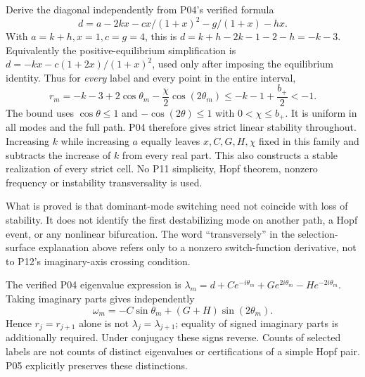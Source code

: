 \documentclass[11pt]{article}
\begin{document}
Derive the diagonal independently from P04's verified formula
\[
 d=a-2kx-cx/(1+x)^2-g/(1+x)-hx.
\]
With $a=k+h,x=1,c=g=4$, this is
$d=k+h-2k-1-2-h=-k-3$. Equivalently the positive-equilibrium
simplification is $d=-kx-c(1+2x)/(1+x)^2$, used only after imposing
the equilibrium identity. Thus for \emph{every} label and every point
in the entire interval,
\[
 r_m=-k-3+2\cos\theta_m-\frac\chi2\cos(2\theta_m)
 \le-k-1+\frac{b_+}{2}<-1.
\]
The bound uses $\cos\theta\le1$ and $-\cos(2\theta)\le1$ with
$0<\chi\le b_+$. It is uniform in all modes and the full path.
P04 therefore gives strict linear stability throughout. Increasing $k$
while increasing $a$ equally leaves $x,C,G,H,\chi$ fixed in this family
and subtracts the increase of $k$ from every real part. This also
constructs a stable realization of every strict cell. No P11 simplicity,
Hopf theorem, nonzero frequency or instability transversality is used.

What is proved is that dominant-mode switching need not coincide with
loss of stability. It does not identify the first destabilizing mode on
another path, a Hopf event, or any nonlinear bifurcation. The word
``transversely'' in the selection-surface explanation above refers only
to a nonzero switch-function derivative, not to P12's imaginary-axis
crossing condition.

The verified P04 eigenvalue expression is
$\lambda_m=d+Ce^{-i\theta_m}+Ge^{2i\theta_m}-He^{-2i\theta_m}$.
Taking imaginary parts gives independently
\[
 \omega_m=-C\sin\theta_m+(G+H)\sin(2\theta_m).
\]
Hence $r_j=r_{j+1}$ alone is not $\lambda_j=\lambda_{j+1}$;
equality of signed imaginary parts is additionally required. Under
conjugacy these signs reverse. Counts of selected labels are not
counts of distinct eigenvalues or certifications of a simple Hopf pair.
P05 explicitly preserves these distinctions.
\end{document}
